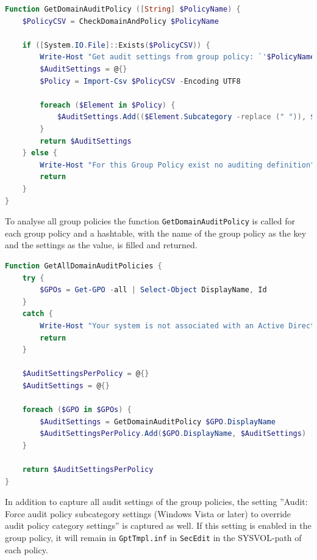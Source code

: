 \begin{lstlisting}[caption=Function GetDomainAuditPolicy, language=PowerShell]
Function GetDomainAuditPolicy ([String] $PolicyName) {
    $PolicyCSV = CheckDomainAndPolicy $PolicyName

    if ([System.IO.File]::Exists($PolicyCSV)) {
        Write-Host "Get audit settings from group policy: `'$PolicyName`'"
        $AuditSettings = @{}
        $Policy = Import-Csv $PolicyCSV -Encoding UTF8

        foreach ($Element in $Policy) {
            $AuditSettings.Add(($Element.Subcategory -replace (" ")), $Element."Setting Value")
        }  
        return $AuditSettings
    } else {
        Write-Host "For this Group Policy exist no auditing definition" 
        return
    }
}
\end{lstlisting}

To analyse all group policies the function \lstinline|GetDomainAuditPolicy| is called for each group policy and a hashtable, with the name of the group policy as the key and the settings as the value, is filled and returned.
\begin{lstlisting}[caption=Function GetAllDomainAuditPolicies, language=PowerShell]
Function GetAllDomainAuditPolicies {
    try {
        $GPOs = Get-GPO -all | Select-Object DisplayName, Id
    }
    catch {
        Write-Host "Your system is not associated with an Active Directory domain or forest"
        return
    }
    
    $AuditSettingsPerPolicy = @{}
    $AuditSettings = @{}

    foreach ($GPO in $GPOs) {
        $AuditSettings = GetDomainAuditPolicy $GPO.DisplayName
        $AuditSettingsPerPolicy.Add($GPO.DisplayName, $AuditSettings)
    }
    
    return $AuditSettingsPerPolicy
}
\end{lstlisting}

\clearpage
In addition to capture all audit settings of the group policies, the setting ''Audit: Force audit policy subcategory settings (Windows Vista or later) to override audit policy category settings'' is captured as well. If this setting is enabled in the group policy, it will remain in \lstinline|GptTmpl.inf| in \lstinline|SecEdit| in the SYSVOL-path of each policy.


